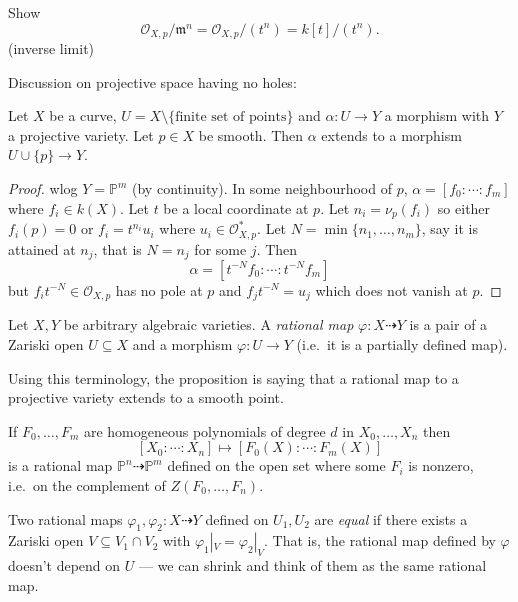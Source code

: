 \documentclass[a4paper]{article}
\renewcommand*{\P}{\mathbb{P}}
\newcommand{\rational}{\dashrightarrow} %
\begin{document}
\begin{ex}
  Show
  \[
    \mathcal O_{X, p} / \mathfrak m^n = \mathcal O_{X, p}/(t^n) = k[t]/(t^n).
  \]
  (inverse limit)
\end{ex}

Discussion on projective space having no holes:
\begin{proposition}
  Let \(X\) be a curve, \(U = X \setminus \{\text{finite set of points}\}\) and \(\alpha: U \to Y\) a morphism with \(Y\) a projective variety. Let \(p \in X\) be smooth. Then \(\alpha\) extends to a morphism \(U \cup \{p\} \to Y\).
\end{proposition}

\begin{proof}
  wlog \(Y = \P^m\) (by continuity). In some neighbourhood of \(p\), \(\alpha = [f_0: \cdots: f_m]\) where \(f_i \in k(X)\). Let \(t\) be a local coordinate at \(p\). Let \(n_i = \nu_p(f_i)\) so either \(f_i(p) = 0\) or \(f_i = t^{n_i} u_i\) where \(u_i \in \mathcal O_{X, p}^*\). Let \(N = \min \{n_1, \dots, n_m\}\), say it is attained at \(n_j\), that is \(N = n_j\) for some \(j\). Then
  \[
    \alpha = [t^{-N} f_0: \cdots :t^{-N} f_m]
  \]
  but \(f_i t^{-N} \in \mathcal O_{X, p}\) has no pole at \(p\) and \(f_j t^{-N} = u_j\) which does not vanish at \(p\).
\end{proof}

\begin{definition}
  Let \(X, Y\) be arbitrary algebraic varieties. A \emph{rational map} \(\varphi: X \rational Y\) is a pair of a Zariski open \(U \subseteq X\) and a morphism \(\varphi: U \to Y\) (i.e.\ it is a partially defined map).
\end{definition}

Using this terminology, the proposition is saying that a rational map to a projective variety extends to a smooth point.

\begin{eg}
  If \(F_0, \dots, F_m\) are homogeneous polynomials of degree \(d\) in \(X_0, \dots, X_n\) then
  \[
    [X_0: \cdots : X_n] \mapsto [F_0(X): \cdots : F_m(X)]
  \]
  is a rational map \(\P^n \rational \P^m\) defined on the open set where some \(F_i\) is nonzero, i.e.\ on the complement of \(Z(F_0, \dots, F_n)\).
\end{eg}

\begin{definition}
  Two rational maps \(\varphi_1, \varphi_2: X \rational Y\) defined on \(U_1, U_2\) are \emph{equal} if there exists a Zariski open \(V \subseteq V_1 \cap V_2\) with \(\varphi_1|_V = \varphi_2|_V\). That is, the rational map defined by \(\varphi\) doesn't depend on \(U\) --- we can shrink and think of them as the same rational map.
\end{definition}
\end{document}
